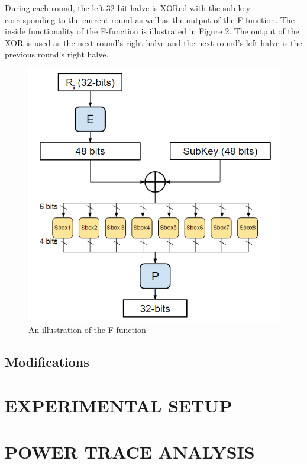 \documentclass[letterpaper, 10 pt, conference]{ieeeconf}  %
\begin{document}
During each round, the left 32-bit halve is XORed with the sub key corresponding to the current round as well as the output of the F-function.  The inside functionality of the F-function is illustrated in Figure 2. The output of the XOR is used as the next round's right halve and the next round's left halve is the previous round's right halve.

\begin{figure}[thpb]
	\centering
	\includegraphics[scale=.50]{Ffunction}
    \caption{An illustration of the F-function}
\end{figure}

\subsection{Modifications}

\section{EXPERIMENTAL SETUP}
 

\section{POWER TRACE ANALYSIS}
\end{document}
